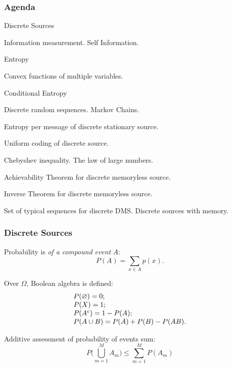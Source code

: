 \documentclass[14pt]{beamer}
\begin{document}
\begin{frame}
\frametitle{Agenda}
\begin{enumerate}
\footnotesize {

\item Discrete Sources
\item Information measurement. Self Information.
\item Entropy
\item Convex functions of multiple variables.
\item Conditional Entropy
\item Discrete random sequences. Markov Chains.
\item Entropy per message of discrete stationary source.
\item Uniform coding of discrete source.
\item Chebyshev inequality. The law of large numbers.
\item Achievability Theorem for discrete memoryless source.
\item Inverse Theorem for discrete memoryless source.
\item Set of typical sequences for discrete DMS. Discrete sources with memory.
}
\end{enumerate}
\end{frame}

\begin{frame}
\frametitle{Discrete Sources}
\begin{itemize}
\small{

    \item Probability is \textit{of a compound event} $A$:
    \[
    P(A) = \sum\limits_{x \in A} {p(x)} .
    \]
    
    \item Over $\Omega$, Boolean algebra is defined:
    \[
    \begin{tabular}{l}
    $ P(\varnothing) = 0; $ \\
    $ P(X) = 1;         $ \\
    $ P(A^c) = 1 - P(A);$\\
    $ P(A \cup B) = P(A) + P(B) - P(AB).$
    \end{tabular}
    \]

    \item Additive assessment of probability of events sum:
    \[
    P(\bigcup\limits_{m = 1}^M {A_m ) \le \sum\limits_{m = 1}^M {P(A_m )} }
    \]
}
\end{itemize}
\end{frame}
\end{document}
